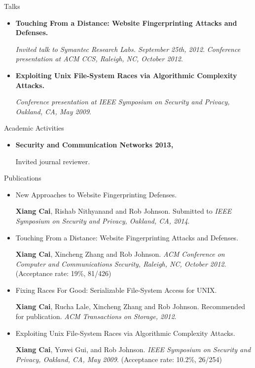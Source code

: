 \documentclass[11pt,oneside]{article}
\newenvironment{ressection}[1]{
	\vspace{4pt}
	{\fontfamily{phv}\selectfont\Large#1}
	\begin{itemize}
	\vspace{3pt}
}{
	\end{itemize}
}
\newcommand{\resitem}[1]{
	\vspace{-4pt}
	\item \begin{flushleft} #1 \end{flushleft}
}
\begin{document}
\begin{ressection}{Talks}
	\resitem{\textbf{Touching From a Distance: Website Fingerprinting
		Attacks and Defenses.} \begin{small}
		
		\textit{Invited talk to Symantec Research Labs. September 25th, 2012}. \textit{Conference presentation at ACM CCS, Raleigh, NC, October 2012}.
		\end{small}}

	\resitem{\textbf{Exploiting Unix File-System Races via Algorithmic
		Complexity Attacks.} \begin{small}
		
		\textit{Conference presentation at IEEE Symposium on Security and Privacy, Oakland, CA, May 2009}.
		\end{small}}
\end{ressection}

\begin{ressection}{Academic Activities}
	\resitem{\textbf{Security and Communication Networks 2013, } \begin{small}Invited journal reviewer.\end{small}
	}
\end{ressection}

\begin{ressection}{Publications}
	\resitem{New Approaches to Website Fingerprinting Defenses. \begin{small} \textbf{Xiang Cai}, Rishab Nithyanand
			and Rob Johnson. Submitted to \textit{IEEE Symposium on Security and Privacy,
				Oakland, CA, 2014}.
	\end{small}}

	\resitem{Touching From a Distance: Website Fingerprinting
		Attacks and Defenses. \begin{small} \textbf{Xiang Cai}, Xincheng Zhang
			and Rob Johnson. \textit{ACM Conference on Computer and Communications Security, Raleigh, NC, October 2012}. (Acceptance rate: 19\%, 81/426)\end{small}}

	\resitem{Fixing Races For Good: Serializable File-System
		Access for UNIX. \begin{small} \textbf{Xiang Cai}, Rucha Lale,
		Xincheng Zhang and Rob Johnson. Recommended for publication. \textit{ACM Transactions on Storage, 2012}.\end{small}}

	\resitem{Exploiting Unix File-System Races via Algorithmic
		Complexity Attacks. \begin{small} \textbf{Xiang Cai}, Yuwei Gui, and
			Rob Johnson. \textit{IEEE Symposium on Security and Privacy,
				Oakland, CA, May 2009}. (Acceptance rate: 10.2\%, 26/254)\end{small}}

\end{ressection}
\end{document}
